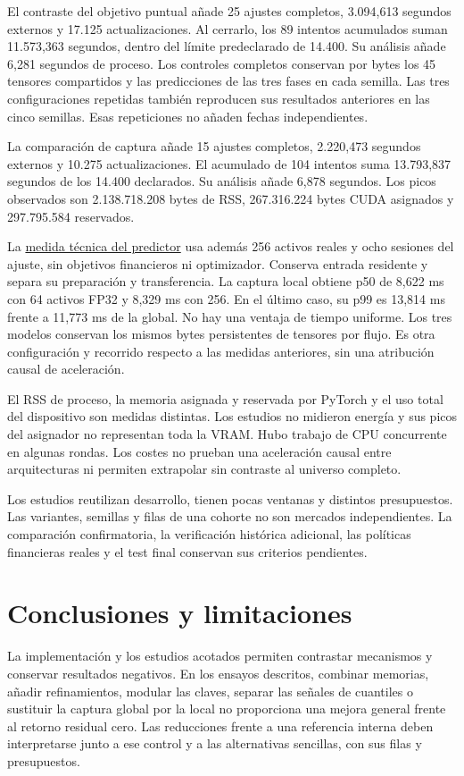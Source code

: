 \documentclass[11pt,a4paper]{report}
\begin{document}
El contraste del objetivo puntual añade 25 ajustes completos,
3.094,613 segundos externos y 17.125 actualizaciones. Al cerrarlo, los
89 intentos acumulados suman 11.573,363 segundos, dentro del límite
predeclarado de 14.400. Su análisis añade 6,281 segundos de proceso.
Los controles completos conservan por bytes los 45 tensores compartidos
y las predicciones de las tres fases en cada semilla. Las tres configuraciones
repetidas también reproducen sus resultados anteriores en las cinco semillas.
Esas repeticiones no añaden fechas independientes.

La comparación de captura añade 15 ajustes completos, 2.220,473 segundos
externos y 10.275 actualizaciones. El acumulado de 104 intentos suma
13.793,837 segundos de los 14.400 declarados. Su análisis añade 6,878
segundos. Los picos observados son 2.138.718.208 bytes de RSS,
267.316.224 bytes CUDA asignados y 297.795.584 reservados.

La \href{https://github.com/GonxKZ/mars-titan/tree/develop/reports/engineering/local-capture-20261020}{medida técnica del predictor}
usa además 256 activos reales y ocho sesiones del ajuste, sin objetivos
financieros ni optimizador. Conserva entrada residente y separa su
preparación y transferencia. La captura local obtiene p50 de 8,622 ms
con 64 activos FP32 y 8,329 ms con 256. En el último caso, su p99 es
13,814 ms frente a 11,773 ms de la global. No hay una ventaja de tiempo
uniforme. Los tres modelos conservan los mismos bytes persistentes de
tensores por flujo. Es otra configuración y recorrido respecto a las
medidas anteriores, sin una atribución causal de aceleración.

El RSS de proceso, la memoria asignada y reservada por PyTorch y el uso total
del dispositivo son medidas distintas. Los estudios no midieron energía y
sus picos del asignador no representan toda la VRAM. Hubo trabajo de CPU
concurrente en algunas rondas. Los costes no prueban una aceleración causal
entre arquitecturas ni permiten extrapolar sin contraste al universo
completo.

Los estudios reutilizan desarrollo, tienen pocas ventanas y distintos
presupuestos. Las variantes, semillas y filas de una cohorte no son mercados
independientes. La comparación confirmatoria, la verificación histórica
adicional, las políticas financieras reales y el test final conservan sus
criterios pendientes.

\chapter{Conclusiones y limitaciones}
La implementación y los estudios acotados permiten contrastar mecanismos y
conservar resultados negativos. En los ensayos descritos, combinar memorias,
añadir refinamientos, modular las claves, separar las señales de cuantiles
o sustituir la captura global por la local
no proporciona una mejora general
frente al retorno residual cero. Las reducciones frente a una referencia
interna deben interpretarse junto a ese control y a las alternativas
sencillas, con sus filas y presupuestos.
\end{document}
